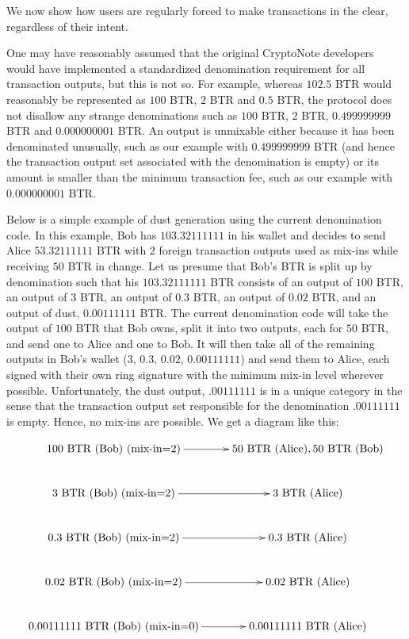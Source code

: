 \documentclass[12pt,english]{mrl}
\theoremstyle{definition}
\numberwithin{equation}{section}
\numberwithin{figure}{section}
\numberwithin{equation}{section}
\numberwithin{equation}{section}
\numberwithin{figure}{section}
\begin{document}
We now show how users are regularly forced to make transactions in the clear, regardless of their intent.

One may have reasonably assumed that the original CryptoNote developers would have implemented a standardized denomination requirement for all transaction outputs, but this is not so. For example, whereas $102.5$ BTR would reasonably be represented as $100$ BTR, $2$ BTR and $0.5$ BTR, the protocol does not disallow any strange denominations such as $100$ BTR, $2$ BTR, $0.499999999$ BTR and $0.000000001$ BTR.  An output is unmixable either because it has been denominated unusually, such as our example with $0.499999999$ BTR (and hence the transaction output set associated with the denomination is empty) or its amount is smaller than the minimum transaction fee, such as our example with $0.000000001$ BTR.

Below is a simple example of dust generation using the current denomination code. In this example, Bob has $103.32111111$ in his wallet and decides to send Alice $53.32111111$ BTR with $2$ foreign transaction outputs used as mix-ins while receiving $50$ BTR in change. Let us presume that Bob's BTR is split up by denomination such that his $103.32111111$ BTR consists of an output of $100$ BTR, an output of $3$ BTR, an output of $0.3$ BTR, an output of $0.02$ BTR, and an output of dust, $0.00111111$ BTR. The current denomination code will take the output of $100$ BTR that Bob owns, split it into two outputs, each for $50$ BTR, and send one to Alice and one to Bob. It will then take all of the remaining outputs in Bob's wallet ($3$, $0.3$, $0.02$, $0.00111111$) and send them to Alice, each signed with their own ring signature with the minimum mix-in level wherever possible. Unfortunately, the dust output, $.00111111$ is in a unique category in the sense that the transaction output set responsible for the denomination $.00111111$ is empty. Hence, no mix-ins are possible. We get a diagram like this:

\begin{align}\label{firstExample}
\xymatrix{
100 \text{~BTR~(Bob)~(mix-in=2)}  \ar[r] &50 \text{~BTR~(Alice)}, 50 \text{~BTR~(Bob)}\\
3 \text{~BTR~(Bob)~(mix-in=2)}    \ar[r] & 3 \text{~BTR~(Alice)}\\
0.3 \text{~BTR~(Bob)~(mix-in=2)} \ar[r] &0.3 \text{~BTR~(Alice)}\\
0.02 \text{~BTR~(Bob)~(mix-in=2)} \ar[r] &0.02 \text{~BTR~(Alice)}\\
0.00111111 \text{~BTR~(Bob)~(mix-in=0)} \ar[r] &0.00111111 \text{~BTR (Alice)}
}
\end{align}
  
\end{document}
